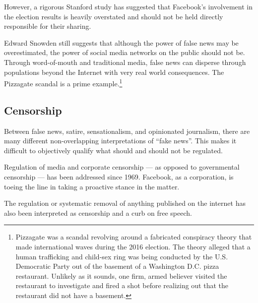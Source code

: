 \par However, a rigorous Stanford study has suggested that Facebook's involvement in the election results is heavily overstated and should not be held directly responsible for their sharing. \cite{stanford_study}

\par Edward Snowden still suggests that although the power of false news may be overestimated, the power of social media networks on the public should not be. \cite{tc_snowden} Through word-of-mouth and traditional media, false news can disperse through populations beyond the Internet with very real world consequences. The Pizzagate scandal is a prime example.\footnote{Pizzagate was a scandal revolving around a fabricated conspiracy theory that made international waves during the 2016 election. The theory alleged that a human trafficking and child-sex ring was being conducted by the U.S. Democratic Party out of the basement of a Washington D.C. pizza restaurant. Unlikely as it sounds, one firm, armed believer visited the restaurant to investigate and fired a shot before realizing out that the restaurant did not have a basement.\cite{ny_pizzagate}} \cite{cbs_fn}

\vfill

\subsection{Censorship}

\par Between false news, satire, sensationalism, and opinionated journalism, there are many different non-overlapping interpretations of ``fake news''. \cite{npr_fn} This makes it difficult to objectively qualify what should and should not be regulated.

\par Regulation of media and corporate censorship --- as opposed to governmental censorship --- has been addressed since 1969. \cite{silent_screen} Facebook, as a corporation, is toeing the line in taking a proactive stance in the matter.

\par The regulation or systematic removal of anything published on the internet has also been interpreted as censorship and a curb on free speech. \cite{eff_bill}

